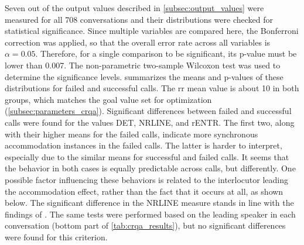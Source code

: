 Seven out of the output values described in \cref{subsec:output_values} were measured for all 708 conversations and their distributions were checked for statistical significance.
Since multiple variables are compared here, the Bonferroni correction \citep{Bonferroni1936teoria} was applied, so that the overall error rate across all variables is $\alpha = 0.05$.
Therefore, for a single comparison to be significant, its p-value must be lower than 0.007.
The non-parametric two-sample Wilcoxon test \citep{Wilcoxon1945individual} was used to determine the significance levels.
 summarizes the means and p-values of these distributions for failed and successful calls.
The \ac{rr} mean value is about 10 in both groups, which matches the goal value set for optimization (\cref{subsec:parameters_crqa}).
Significant differences between failed and successful calls were found for the values DET, NRLINE, and rENTR.
The first two, along with their higher means for the failed calls, indicate more synchronous accommodation instances in the failed calls.
The latter is harder to interpret, especially due to the similar means for successful and failed calls.
It seems that the behavior in both cases is equally predictable across calls, but differently.
One possible factor influencing these behaviors is related to the interlocutor leading the accommodation effect, rather than the fact that it occurs at all, as shown below.
The significant difference in the NRLINE measure stands in line with the findings of \citet{Borrie2019syncing}.
The same tests were performed based on the leading speaker in each conversation (bottom part of \cref{tab:crqa_results}), but no significant differences were found for this criterion.

